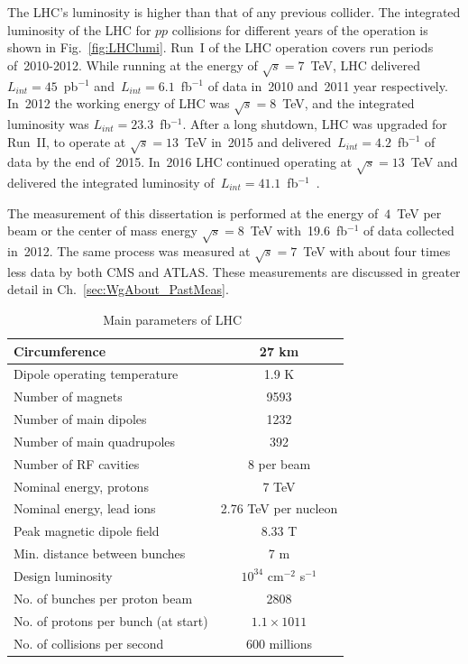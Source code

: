 The LHC's luminosity is higher than that of any previous collider. The integrated luminosity of the LHC for $pp$ collisions for different years of the operation is shown in Fig.~\ref{fig:LHClumi}. Run~I of the LHC operation covers run periods of~2010-2012. While running at the energy of $\sqrt{s}=7$~TeV, LHC delivered~$L_{int}=45$~pb$^{-1}$ and~$L_{int}=6.1$~fb$^{-1}$ of data in~2010 and~2011 year respectively. In~2012 the working energy of LHC was $\sqrt{s}=8$~TeV, and the integrated luminosity was $L_{int}=23.3$~fb$^{-1}$.  After a long shutdown, LHC was upgraded for Run~II, to operate at $\sqrt{s}=13$~TeV in~2015 and delivered~$L_{int}=4.2$~fb$^{-1}$ of data by the end of~2015. In~2016 LHC continued operating at $\sqrt{s}=13$~TeV and delivered the integrated luminosity of~$L_{int}=41.1$~fb$^{-1}$~\cite{ref_LHClumi_twiki}.

The measurement of this dissertation is performed at the energy of~$4$~TeV per beam or the center of mass energy $\sqrt{s}=8$~TeV with~19.6~fb$^{-1}$ of data collected in~2012. The same process was measured at $\sqrt{s}=7$~TeV with about four times less data by both CMS and ATLAS. These measurements are discussed in greater detail in Ch.~\ref{sec:WgAbout_PastMeas}.

\begin{table}[h]
  \begin{center}
  \caption{ Main parameters of LHC~\cite{ref_LHC_brochure}}
  \vspace{5 mm}
  \begin{tabular}{|l|c|}
     \hline
     Circumference & 27 km  \\ \hline
     Dipole operating temperature &  1.9 K \\ \hline
     Number of magnets &  9593 \\ \hline
     Number of main dipoles &  1232 \\ \hline
     Number of main quadrupoles &  392 \\ \hline
     Number of RF cavities &  8 per beam \\ \hline
     Nominal energy, protons &  7 TeV \\ \hline
     Nominal energy, lead ions &  2.76 TeV per nucleon \\ \hline
     Peak magnetic dipole field &  8.33 T \\ \hline
     Min. distance between bunches &  7 m \\ \hline
     Design luminosity &  $10^{34}$ cm$^{-2}$ s$^{-1}$ \\ \hline
     No. of bunches per proton beam &  2808 \\ \hline
     No. of protons per bunch (at start) &  $1.1\times 10{11}$ \\ \hline
     No. of collisions per second &  600 millions \\ \hline
  \end{tabular}
  \label{tab:LHCparameters}
  \end{center}
\end{table}

